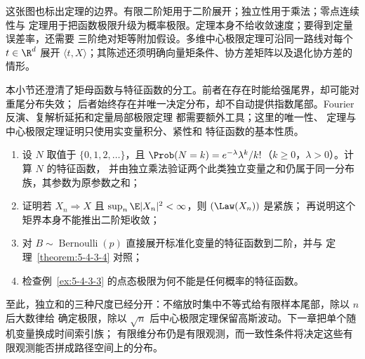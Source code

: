 \begin{center}
\end{center}

这张图也标出定理的边界。有限二阶矩用于二阶展开；独立性用于乘法；零点连续性与
\Levy{} 定理用于把函数极限升级为概率极限。定理本身不给收敛速度；要得到定量误差率，还需要
三阶绝对矩等附加假设。多维中心极限定理可沿同一路线对每个 $t\in\R^d$ 展开
$\langle t,X\rangle$；其陈述还须明确向量矩条件、协方差矩阵以及退化协方差的情形。

本小节还澄清了矩母函数与特征函数的分工。前者在存在时能给强尾界，却可能对重尾分布失效；
后者始终存在并唯一决定分布，却不自动提供指数尾部。Fourier 反演、复解析延拓和定量局部极限定理
都需要额外工具；这里的唯一性、\Levy{} 定理与中心极限定理证明只使用实变量积分、紧性和
特征函数的基本性质。

\begin{exercise}[特征函数与极限]
\begin{enumerate}
 \item 设 $N$ 取值于 $\{0,1,2,\ldots\}$，且
 $\Prob(N=k)=e^{-\lambda}\lambda^k/k!$（$k\geq0$，$\lambda>0$）。计算 $N$ 的特征函数，
 并由独立乘法验证两个此类独立变量之和仍属于同一分布族，其参数为原参数之和；
 \item 证明若 $X_n\Rightarrow X$ 且 $\sup_n\E|X_n|^2<\infty$，则 $(\Law(X_n))$ 是紧族；
       再说明这个矩界本身不能推出二阶矩收敛；
 \item 对 $B\sim\operatorname{Bernoulli}(p)$ 直接展开标准化变量的特征函数到二阶，并与
       定理~\ref{theorem:5-4-3-4} 对照；
 \item 检查例~\ref{ex:5-4-3-3} 的点态极限为何不能是任何概率的特征函数。
\end{enumerate}
\end{exercise}

至此，独立和的三种尺度已经分开：不缩放时集中不等式给有限样本尾部，除以 $n$ 后大数律给
确定极限，除以 $\sqrt n$ 后中心极限定理保留高斯波动。下一章把单个随机变量换成时间索引族；
有限维分布仍是有限观测，而一致性条件将决定这些有限观测能否拼成路径空间上的分布。
